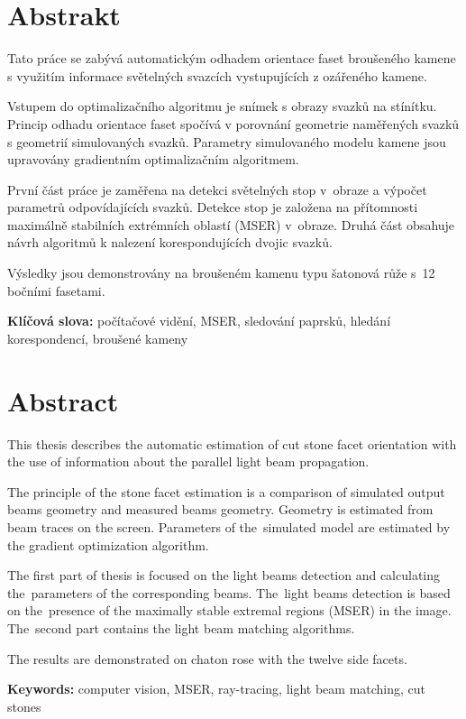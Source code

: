 \section*{Abstrakt}
Tato práce se zabývá automatickým odhadem orientace faset broušeného kamene s využitím informace světelných svazcích vystupujících z ozářeného kamene. 

Vstupem do optimalizačního algoritmu je snímek s obrazy svazků na stínítku. Princip odhadu orientace faset spočívá v porovnání geometrie naměřených svazků s geometrií simulovaných svazků. Parametry simulovaného modelu kamene jsou upravovány gradientním optimalizačním algoritmem. 

 První část práce je zaměřena na detekci světelných stop v~obraze a výpočet parametrů odpovídajících svazků. Detekce stop je založena na přítomnosti maximálně stabilních extrémních oblastí (MSER) v~obraze. Druhá část obsahuje návrh algoritmů k nalezení korespondujících dvojic svazků.   

Výsledky jsou demonstrovány  na broušeném kamenu typu šatonová růže s~12 bočními fasetami.

\textbf{Klíčová slova:} počítačové vidění, MSER, sledování paprsků, hledání korespondencí, broušené kameny 

\section*{Abstract}

This thesis describes the automatic estimation of cut stone facet orientation with the use of information about the parallel light beam propagation.

The principle of the stone facet estimation is a comparison of simulated output beams geometry and measured beams geometry. Geometry is estimated from beam traces on the screen. Parameters of the~simulated model are estimated by the gradient optimization algorithm. 

The first part of thesis is focused on the light beams detection and calculating the~parameters of the corresponding beams. The~light beams detection is based on the~presence of the maximally stable extremal regions (MSER) in the image. The~second part contains the light beam matching algorithms.

The results are demonstrated on chaton rose with the twelve side facets.


\textbf{Keywords:} computer vision, MSER, ray-tracing, light beam matching, cut stones
